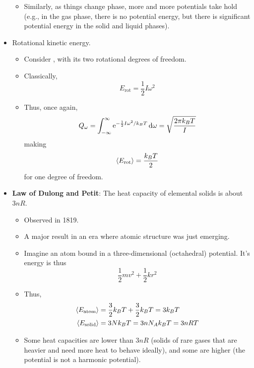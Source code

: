 \documentclass[../notes.tex]{subfiles}
\begin{document}
\begin{itemize}
\begin{itemize}
        \item Similarly, as things change phase, more and more potentials take hold (e.g., in the gas phase, there is no potential energy, but there is significant potential energy in the solid and liquid phases).
    \end{itemize}
    \item Rotational kinetic energy.
    \begin{itemize}
        \item Consider , with its two rotational degrees of freedom.
        \item Classically,
        \begin{equation*}
            E_\text{rot} = \frac{1}{2}I\omega^2
        \end{equation*}
        \item Thus, once again,
        \begin{equation*}
            Q_\omega = \int_{-\infty}^\infty\e[-\frac{1}{2}I\omega^2/k_BT]\dd{\omega}
            = \sqrt{\frac{2\pi k_BT}{I}}
        \end{equation*}
        making
        \begin{equation*}
            \prb{E_\text{rot}} = \frac{k_BT}{2}
        \end{equation*}
        for one degree of freedom.
    \end{itemize}
    \item \textbf{Law of Dulong and Petit}: The heat capacity of elemental solids is about $3nR$.
    \begin{itemize}
        \item Observed in 1819.
        \item A major result in an era where atomic structure was just emerging.
        \item Imagine an atom bound in a three-dimensional (octahedral) potential. It's energy is thus
        \begin{equation*}
            \frac{1}{2}mv^2+\frac{1}{2}kr^2
        \end{equation*}
        \item Thus,
        \begin{align*}
            \prb{E_\text{atom}} &= \frac{3}{2}k_BT+\frac{3}{2}k_BT = 3k_BT\\
            \prb{E_\text{solid}} &= 3Nk_BT = 3nN_Ak_BT = 3nRT
        \end{align*}
        \item Some heat capacities are lower than $3nR$ (solids of rare gases that are heavier and need more heat to behave ideally), and some are higher (the potential is not a harmonic potential).

\end{itemize}
\end{itemize}
\end{document}
